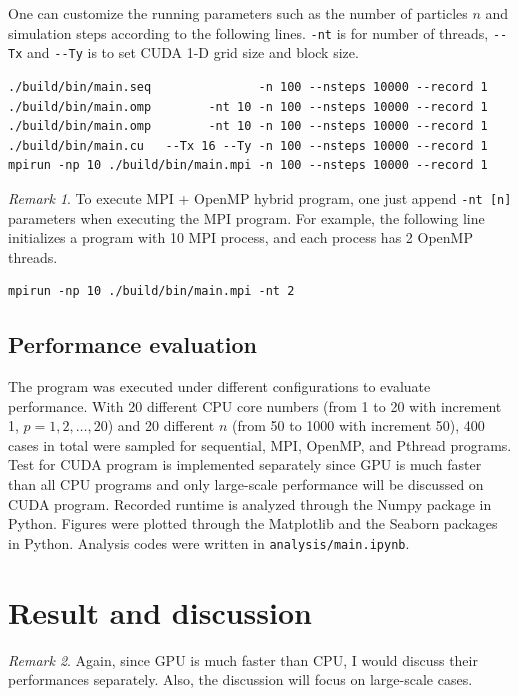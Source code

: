 \documentclass[twoside,12pt]{article}
\theoremstyle{definition}
\theoremstyle{remark}
\newtheorem*{remark}{Remark}
\begin{document}
One can customize the running parameters such as the number of particles $n$ and
simulation steps according to the following lines.
\lstinline|-nt| is for number of threads, \lstinline|--Tx| and \lstinline|--Ty|
is to set CUDA 1-D grid size and block size.
\begin{lstlisting}[style=sh]
./build/bin/main.seq               -n 100 --nsteps 10000 --record 1
./build/bin/main.omp        -nt 10 -n 100 --nsteps 10000 --record 1
./build/bin/main.omp        -nt 10 -n 100 --nsteps 10000 --record 1
./build/bin/main.cu   --Tx 16 --Ty -n 100 --nsteps 10000 --record 1
mpirun -np 10 ./build/bin/main.mpi -n 100 --nsteps 10000 --record 1
\end{lstlisting}
\begin{remark}
To execute MPI + OpenMP hybrid program, one just append \lstinline|-nt [n]| parameters
when executing the MPI program.
For example, the following line initializes a program with 10 MPI process,
and each process has 2 OpenMP threads.
\begin{lstlisting}[style=sh]
mpirun -np 10 ./build/bin/main.mpi -nt 2
\end{lstlisting}
\end{remark}


\subsection{Performance evaluation}
The program was executed under 
different configurations to evaluate performance.
With 20 different CPU core numbers (from 1 to 20 with increment 1, $p=1, 2,\dots, 20$)
and 20 different $n$ (from 50 to 1000 with increment 50),
400 cases in total were sampled for sequential, MPI, OpenMP, and Pthread programs.
Test for CUDA program is implemented separately since GPU is much faster
than all CPU programs and only large-scale performance will be discussed
on CUDA program.
Recorded runtime is analyzed through the Numpy
package in Python.
Figures were plotted through the Matplotlib and the Seaborn packages in Python.
Analysis codes were written in \lstinline|analysis/main.ipynb|.


\newpage
\section{Result and discussion}
\begin{remark}
Again, since GPU is much faster than CPU, I would discuss their
performances separately.
Also, the discussion will focus on large-scale cases.
\end{remark}
\end{document}
